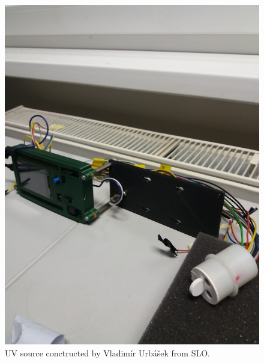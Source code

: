  \begin{figure}[H]
 \centering
 \includegraphics[scale=0.09, angle = 270, origin = c]{./pictures/KarlsRuhe}
 \caption{UV source conctructed by Vladimír Urbášek from SLO.}
 \label{UVsource}
\end{figure}

